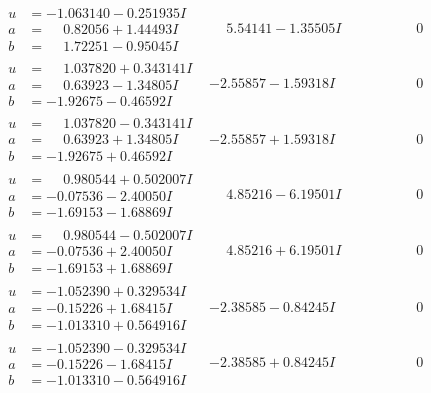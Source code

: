 \documentclass[1p]{elsarticle_modified}
\theoremstyle{definition}
\begin{document}
$$\begin{array}{c|c|c}
\begin{aligned}
u &= -1.063140 - 0.251935 I \\
a &= \phantom{-}0.82056 + 1.44493 I \\
b &= \phantom{-}1.72251 - 0.95045 I\end{aligned}
 & \phantom{-}5.54141 - 1.35505 I & \phantom{-0.000000 } 0 \\ \hline\begin{aligned}
u &= \phantom{-}1.037820 + 0.343141 I \\
a &= \phantom{-}0.63923 - 1.34805 I \\
b &= -1.92675 - 0.46592 I\end{aligned}
 & -2.55857 - 1.59318 I & \phantom{-0.000000 } 0 \\ \hline\begin{aligned}
u &= \phantom{-}1.037820 - 0.343141 I \\
a &= \phantom{-}0.63923 + 1.34805 I \\
b &= -1.92675 + 0.46592 I\end{aligned}
 & -2.55857 + 1.59318 I & \phantom{-0.000000 } 0 \\ \hline\begin{aligned}
u &= \phantom{-}0.980544 + 0.502007 I \\
a &= -0.07536 - 2.40050 I \\
b &= -1.69153 - 1.68869 I\end{aligned}
 & \phantom{-}4.85216 - 6.19501 I & \phantom{-0.000000 } 0 \\ \hline\begin{aligned}
u &= \phantom{-}0.980544 - 0.502007 I \\
a &= -0.07536 + 2.40050 I \\
b &= -1.69153 + 1.68869 I\end{aligned}
 & \phantom{-}4.85216 + 6.19501 I & \phantom{-0.000000 } 0 \\ \hline\begin{aligned}
u &= -1.052390 + 0.329534 I \\
a &= -0.15226 + 1.68415 I \\
b &= -1.013310 + 0.564916 I\end{aligned}
 & -2.38585 - 0.84245 I & \phantom{-0.000000 } 0 \\ \hline\begin{aligned}
u &= -1.052390 - 0.329534 I \\
a &= -0.15226 - 1.68415 I \\
b &= -1.013310 - 0.564916 I\end{aligned}
 & -2.38585 + 0.84245 I & \phantom{-0.000000 } 0 \\ \hline\begin{aligned}

\end{aligned}
\end{array}$$
\end{document}
